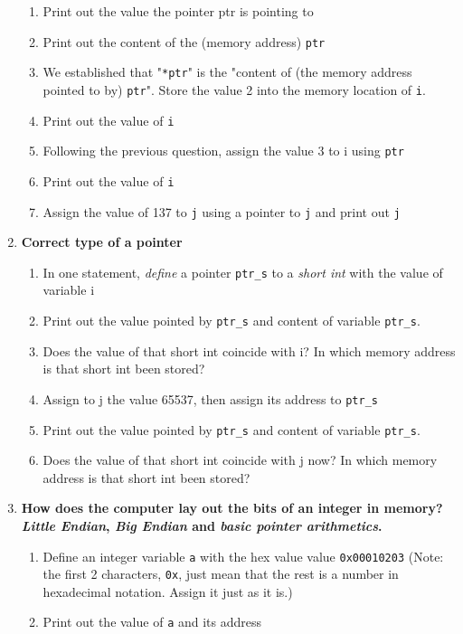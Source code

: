 \documentclass{article}
\begin{document}
\begin{enumerate}
\begin{enumerate}[label=\arabic*]
		\item Print out the value the pointer ptr is pointing to
		\item Print out the content of the (memory address) \texttt{ptr}
		\item We established that "\texttt{*ptr}" is the "content of (the memory address pointed to by) \texttt{ptr}". Store the value 2 into the memory location of \texttt{i}.
		\item Print out the value of \texttt{i}
		\item Following the previous question, assign the value 3 to i using \texttt{ptr}
		\item Print out the value of \texttt{i}
		\item Assign the value of 137 to \texttt{j} using a pointer to \texttt{j} and print out \texttt{j}
	\end{enumerate}
	\item \textbf{Correct type of a pointer}
    \begin{enumerate}[label=\arabic*]
		\item In one statement, \textit{define} a pointer \texttt{ptr\_s} to a \textit{short int} with the value of variable i
		\item Print out the value pointed by \texttt{ptr\_s} and content of variable \texttt{ptr\_s}. 
		\item Does the value of that short int coincide with i? In which memory address is that short int been stored?
		\item Assign to j the value 65537, then assign its address to \texttt{ptr\_s}
		\item Print out the value pointed by \texttt{ptr\_s} and content of variable \texttt{ptr\_s}. 
		\item Does the value of that short int coincide with j now? In which memory address is that short int been stored?
	\end{enumerate}
	\item \textbf{How does the computer lay out the bits of an integer in memory? \textit{Little Endian}, \textit{Big Endian} and \textit{basic pointer arithmetics}. }
    \begin{enumerate}[label=\arabic*]
			\item Define an integer variable \texttt{a} with the hex value value  \texttt{0x00010203} (Note: the first 2 characters, \texttt{0x}, just mean that
					the rest is a number in hexadecimal notation. Assign it just as it is.)
			\item Print out the value of \texttt{a} and its address

\end{enumerate}
\end{enumerate}
\end{document}
